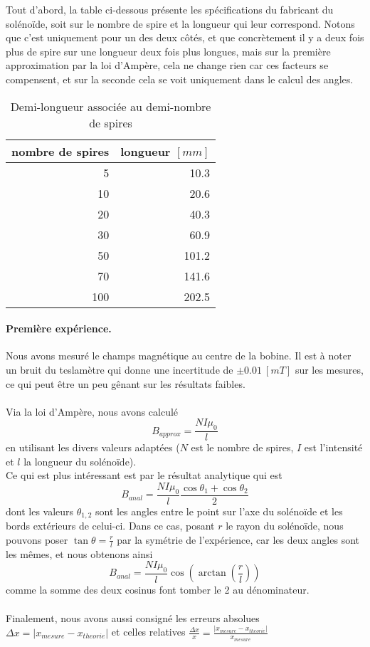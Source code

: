 
Tout d'abord, la table ci-dessous présente les spécifications du fabricant du solénoïde, soit sur le nombre de spire et la longueur qui leur correspond.
Notons que c'est uniquement pour un des deux côtés, et que concrètement il y a deux fois plus de spire sur une longueur deux fois plus longues, mais sur la première approximation par la loi d'Ampère, cela ne change rien car ces facteurs se compensent, et sur la seconde cela se voit uniquement dans le calcul des angles.

\begin{table}[H]
\centering
\begin{tabular}{rr}
\toprule
 nombre de spires &  longueur $[mm]$ \\
\midrule
        5 &  10.3 \\
       10 &  20.6 \\
       20 &  40.3 \\
       30 &  60.9 \\
       50 & 101.2 \\
       70 & 141.6 \\
      100 & 202.5 \\
\bottomrule
\end{tabular}
\caption{Demi-longueur associée au demi-nombre de spires}
\end{table}

\paragraph*{Première expérience.} Nous avons mesuré le champs magnétique au centre de la bobine. Il est à noter un bruit du teslamètre qui donne une incertitude de $\pm 0.01 \ [mT]$ sur les mesures, ce qui peut être un peu gênant sur les résultats faibles. \\ \\
Via la loi d'Ampère, nous avons calculé 
$$ B_{approx} = \frac{N I \mu_0}{l} $$
en utilisant les divers valeurs adaptées ($N$ est le nombre de spires, $I$ est l'intensité et $l$ la longueur du solénoïde).\\
Ce qui est plus intéressant est par le résultat analytique qui est
$$ B_{anal} = \frac{N I \mu_0}{l} \frac{\cos \theta_1 + \cos \theta_2}{2} $$
dont les valeurs $\theta_{1,2}$ sont les angles entre le point sur l'axe du solénoïde et les bords extérieurs de celui-ci. Dans ce cas, posant $r$ le rayon du solénoïde, nous pouvons poser $\tan \theta = \frac{r}{l}$ par la symétrie de l'expérience, car les deux angles sont les mêmes, et nous obtenons ainsi
$$ B_{anal} = \frac{N I \mu_0}{l} \cos \left( \arctan \left( \frac{r}{l} \right) \right) $$
comme la somme des deux cosinus font tomber le 2 au dénominateur.\\ \\
Finalement, nous avons aussi consigné les erreurs absolues $\Delta x = | x_{mesure} - x_{theorie} |$ et celles relatives $\frac{\Delta x}{x} = \frac{| x_{mesure} - x_{theorie} |}{x_{mesure}} $

